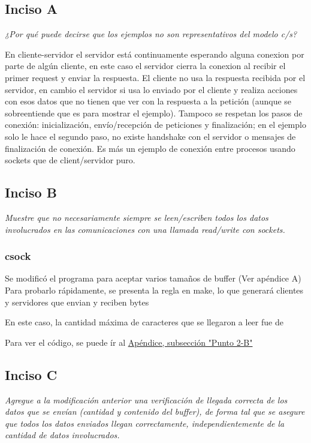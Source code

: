 \documentclass[12pt,journal,compsoc]{IEEEtran}
\begin{document}
\subsection{Inciso A}
\textit{¿Por qué puede decirse que los ejemplos no son representativos del modelo c/s?}

En cliente-servidor el servidor está continuamente esperando alguna conexion por parte de algún cliente, en este caso el servidor cierra la conexion al recibir el primer request y enviar la respuesta. El cliente no usa la respuesta recibida por el servidor, en cambio el servidor si usa lo enviado por el cliente y realiza acciones con esos datos que no tienen que ver con la respuesta a la petición (aunque se sobreentiende que es para mostrar el ejemplo).
Tampoco se respetan los pasos de conexión: inicialización, envío/recepción de peticiones y finalización; en el ejemplo solo le hace el segundo paso, no existe handshake con el servidor o mensajes de finalización de conexión. Es más un ejemplo de conexión entre procesos usando sockets que de client/servidor puro.

\subsection{Inciso B}
\textit{Muestre que no necesariamente siempre se leen/escriben todos los datos involucrados en
las comunicaciones con una llamada read/write con sockets.}
\subsubsection{csock}
Se modificó el programa para aceptar varios tamaños de buffer (Ver apéndice A)
Para probarlo rápidamente, se presenta la regla en make, lo que generará clientes y servidores que envian y reciben bytes

En este caso, la cantidad máxima de caracteres que se llegaron a leer fue de 



Para ver el código, se puede ír al \hyperref[punto2b]{Apéndice, subsección "Punto 2-B"}

\subsection{Inciso C}
\textit{Agregue a la modificación anterior una verificación de llegada correcta de los datos que se
envían (cantidad y contenido del buffer), de forma tal que se asegure que todos los datos
enviados llegan correctamente, independientemente de la cantidad de datos
involucrados.}
\end{document}
